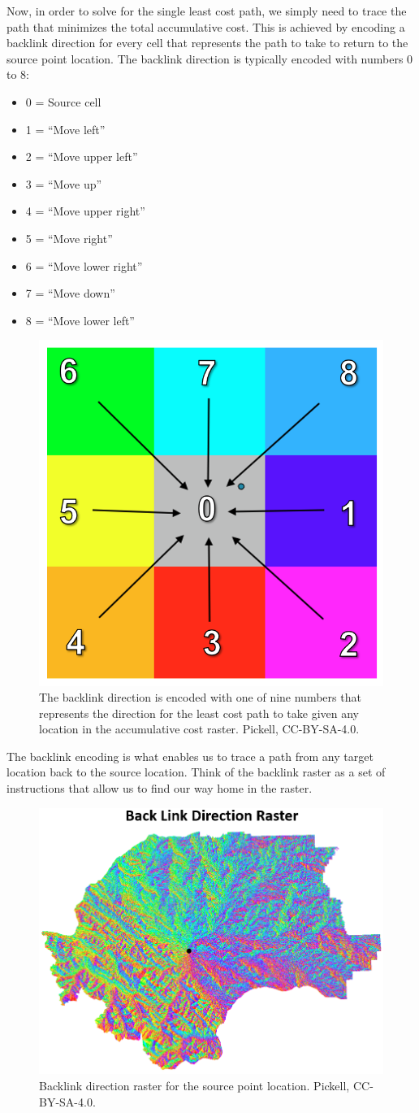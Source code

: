 \documentclass[
]{book}
\providecommand{\tightlist}{%
  \setlength{\itemsep}{0pt}\setlength{\parskip}{0pt}}
\begin{document}
Now, in order to solve for the single least cost path, we simply need to trace the path that minimizes the total accumulative cost. This is achieved by encoding a backlink direction for every cell that represents the path to take to return to the source point location. The backlink direction is typically encoded with numbers 0 to 8:

\begin{itemize}
\tightlist
\item
  0 = Source cell
\item
  1 = ``Move left''
\item
  2 = ``Move upper left''
\item
  3 = ``Move up''
\item
  4 = ``Move upper right''
\item
  5 = ``Move right''
\item
  6 = ``Move lower right''
\item
  7 = ``Move down''
\item
  8 = ``Move lower left''
\end{itemize}

\begin{figure}
\includegraphics[width=0.25\linewidth]{images/08-backlink-direction-encoding} \caption{The backlink direction is encoded with one of nine numbers that represents the direction for the least cost path to take given any location in the accumulative cost raster. Pickell, CC-BY-SA-4.0.}\label{fig:8-backlink-direction-encoding}
\end{figure}

The backlink encoding is what enables us to trace a path from any target location back to the source location. Think of the backlink raster as a set of instructions that allow us to find our way home in the raster.

\begin{figure}
\includegraphics[width=0.75\linewidth]{images/08-backlink-direction-raster} \caption{Backlink direction raster for the source point location. Pickell, CC-BY-SA-4.0.}\label{fig:8-backlink-direction-raster}
\end{figure}
\end{document}
